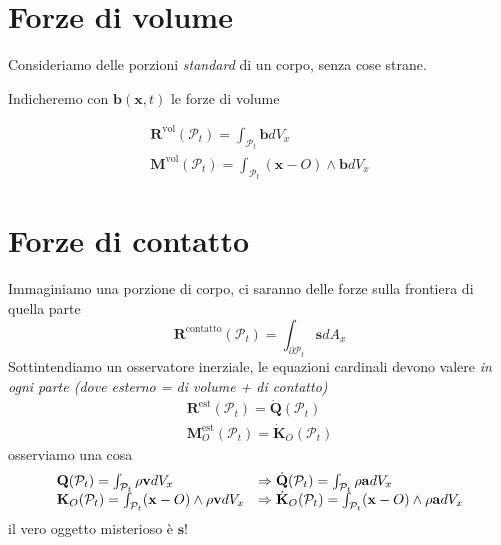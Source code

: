 \documentclass[10pt,a4paper,twoside]{book}
\begin{document}
\section{Forze di volume}


Consideriamo delle porzioni \textit{standard} di un corpo, senza cose strane.

Indicheremo con $\mathbf{b}(\mathbf{x} ,t)$ le forze di volume


\begin{gather*}
\mathbf{R}^{\text{vol}}(\mathcal{P}_{t}) =\int _{\mathcal{P}_{t}}\mathbf{b} dV_{x}\\
\mathbf{M}^{\text{vol}}(\mathcal{P}_{t}) =\int _{\mathcal{P}_{t}}(\mathbf{x} -O) \land \mathbf{b} dV_{x}
\end{gather*}
\section{Forze di contatto}


Immaginiamo una porzione di corpo, ci saranno delle forze sulla frontiera di quella parte
\begin{equation*}
\mathbf{R}^{\text{contatto}}(\mathcal{P}_{t}) =\int _{\partial \mathcal{P}_{t}}\mathbf{s} dA_{x}
\end{equation*}
Sottintendiamo un osservatore inerziale, le equazioni cardinali devono valere \textit{in ogni parte (dove esterno = di volume + di contatto)}
\begin{gather*}
\mathbf{R}^{\text{est}}(\mathcal{P}_{t}) =\dot{\mathbf{Q}}(\mathcal{P}_{t})\\
\mathbf{M}^{\text{est}}_{O}(\mathcal{P}_{t}) =\dot{\mathbf{K}}_{O}(\mathcal{P}_{t})
\end{gather*}
osserviamo una cosa
\begin{equation*}
\begin{array}{ l l }
\mathbf{Q}(\mathcal{P}_{t}) =\int _{\mathcal{P}_{t}} \rho \mathbf{v} dV_{x} & \Rightarrow \dot{\mathbf{Q}}(\mathcal{P}_{t}) =\int _{\mathcal{P}_{t}} \rho \mathbf{a} dV_{x}\\
\mathbf{K}_{O}(\mathcal{P}_{t}) =\int _{\mathcal{P}_{t}}(\mathbf{x} -O) \land \rho \mathbf{v} dV_{x} & \Rightarrow \dot{\mathbf{K}}_{O}(\mathcal{P}_{t}) =\int _{\mathcal{P}_{t}}(\mathbf{x} -O) \land \rho \mathbf{a} dV_{x}
\end{array}
\end{equation*}
il vero oggetto misterioso è $\mathbf{s}$!
\end{document}
